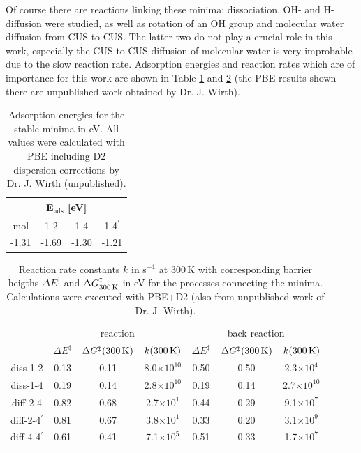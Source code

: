 \documentclass[11pt,DIV=13,BCOR=5mm,a4paper,headinclude]{scrbook}
\begin{document}
Of course there are reactions linking these minima: dissociation, OH- and H-diffusion were studied, as well as rotation of an OH group and molecular water diffusion from CUS to CUS.
The latter two do not play a crucial role in this work, especially the CUS to CUS diffusion of molecular water is very improbable due to the slow reaction rate.
Adsorption energies and reaction rates which are of importance for this work are shown in Table \ref{tab:0001_eads} and \ref{tab:0001_rates} (the PBE results shown there are unpublished work obtained by Dr. J. Wirth).
\begin{table}[!h]
  \centering
   \caption{Adsorption energies for the stable minima in eV.
All values were calculated with PBE including D2 dispersion corrections by Dr. J. Wirth (unpublished).}
  \begin{tabular}{cccc}
  \toprule
   \multicolumn{4}{c}{E$_\textrm{ads}$ [eV]}\\\midrule
  mol &1-2 &1-4 &1-4$^\prime$  \\
  -1.31 & -1.69 & -1.30 & -1.21\\\bottomrule
    \end{tabular}
  \label{tab:0001_eads}
\end{table}
\begin{table}[!h]
  \centering
   \caption{Reaction rate constants $k$ in s$^{-1}$ at $300\,$K with corresponding barrier heigths $\Delta E^\ddagger$ and $\Delta G^\ddagger_\textrm{300\,K}$ in eV for the processes connecting the minima.
Calculations were executed with PBE+D2 (also from unpublished work of Dr. J. Wirth).}
  \begin{tabular}{c|ccc||ccc}
  \toprule
   &\multicolumn{3}{c}{reaction} & \multicolumn{3}{c}{back reaction}\\
   &              $\Delta E^\ddagger$ & $\Delta G^\ddagger(\textrm{300\,K})$ &$k(\textrm{300\,K})$&$\Delta E^\ddagger$ & $\Delta G^\ddagger(\textrm{300\,K})$ &$k(\textrm{300\,K})$\\\midrule
diss-1-2         &0.13 & 0.11 & 8.0$\times 10^{10}$ & 0.50 & 0.50 & 2.3$\times 10^4$ \\
diss-1-4         &0.19 & 0.14 & 2.8$\times 10^{10}$ & 0.19 & 0.14 & 2.7$\times 10^{10}$\\
diff-2-4         &0.82 & 0.68 & 2.7$\times 10^1$ & 0.44 & 0.29 & 9.1$\times 10^7$ \\
diff-2-4$^\prime$&0.81 & 0.67 & 3.8$\times 10^1$ & 0.33 & 0.20 & 3.1$\times 10^9$\\
diff-4-4$^\prime$&0.61 & 0.41 & 7.1$\times 10^5$ & 0.51 & 0.33 & 1.7$\times 10^7$\\\bottomrule
    \end{tabular}
  \label{tab:0001_rates}
\end{table}
\\
\end{document}

